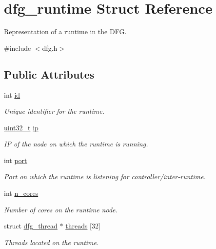 \hypertarget{structdfg__runtime}{\section{dfg\-\_\-runtime Struct Reference}
\label{structdfg__runtime}
}


Representation of a runtime in the D\-F\-G.  




{\ttfamily \#include $<$dfg.\-h$>$}

\subsection*{Public Attributes}
\begin{DoxyCompactItemize}
\item 
int \hyperlink{structdfg__runtime_ab9978989f372b69d34ef5e186a5db881}{id}
\begin{DoxyCompactList}\small\item\em Unique identifier for the runtime. \end{DoxyCompactList}\item 
\hyperlink{msus_2webserver_2uthash_8h_a435d1572bf3f880d55459d9805097f62}{uint32\-\_\-t} \hyperlink{structdfg__runtime_ad0f9d4865c5f177d2062ade3ddf407b4}{ip}
\begin{DoxyCompactList}\small\item\em I\-P of the node on which the runtime is running. \end{DoxyCompactList}\item 
int \hyperlink{structdfg__runtime_a112f547c6913972fc06b6ff614995bf1}{port}
\begin{DoxyCompactList}\small\item\em Port on which the runtime is listening for controller/inter-\/runtime. \end{DoxyCompactList}\item 
int \hyperlink{structdfg__runtime_a70d2e7498c96220b9483710588bdd07c}{n\-\_\-cores}
\begin{DoxyCompactList}\small\item\em Number of cores on the runtime node. \end{DoxyCompactList}\item 
struct \hyperlink{structdfg__thread}{dfg\-\_\-thread} $\ast$ \hyperlink{structdfg__runtime_a4b28fe6113c7edf2f4defb4edee42078}{threads} \mbox{[}32\mbox{]}
\begin{DoxyCompactList}\small\item\em Threads located on the runtime. \end{DoxyCompactList}\item 

\end{DoxyCompactItemize}
